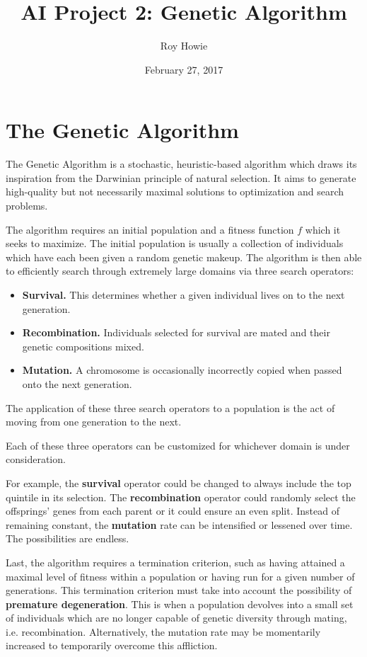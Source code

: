 \documentclass{article}
\begin{document}
\title{AI Project 2: Genetic Algorithm}
\author{Roy Howie}
\date{February 27, 2017}
\maketitle


\section{The Genetic Algorithm}
  The Genetic Algorithm is a stochastic, heuristic-based algorithm which draws
  its inspiration from the Darwinian principle of natural selection. It aims to
  generate high-quality but not necessarily maximal solutions to optimization
  and search problems.

  The algorithm requires an initial population and a fitness function $f$ which
  it seeks to maximize. The initial population is usually a collection of
  individuals which have each been given a random genetic makeup. The algorithm
  is then able to efficiently search through extremely large domains via three
  search operators:
  \begin{itemize}
    \renewcommand\labelitemi{}
    \item{
      \textbf{Survival.} This determines whether a given individual lives on to
      the next generation.
    }
    \item{
      \textbf{Recombination.} Individuals selected for survival are mated and
      their genetic compositions mixed.
    }
    \item{
      \textbf{Mutation.} A chromosome is occasionally incorrectly copied when
      passed onto the next generation.
    }
  \end{itemize}
  The application of these three search operators to a population is the act of
  moving from one generation to the next.

  Each of these three operators can be customized for whichever domain is under
  consideration.

  For example, the \textbf{survival} operator could be changed to always include
  the top quintile in its selection. The \textbf{recombination} operator could
  randomly select the offsprings' genes from each parent or it could ensure an
  even split. Instead of remaining constant, the \textbf{mutation} rate can be
  intensified or lessened over time. The possibilities are endless.

  Last, the algorithm requires a termination criterion, such as having
  attained a maximal level of fitness within a population or having run for a
  given number of generations. This termination criterion must take into account
  the possibility of \textbf{premature degeneration}. This is when a population
  devolves into a small set of individuals which are no longer capable of
  genetic diversity through mating, i.e. recombination. Alternatively, the
  mutation rate may be momentarily increased to temporarily overcome this
  affliction.
\end{document}
